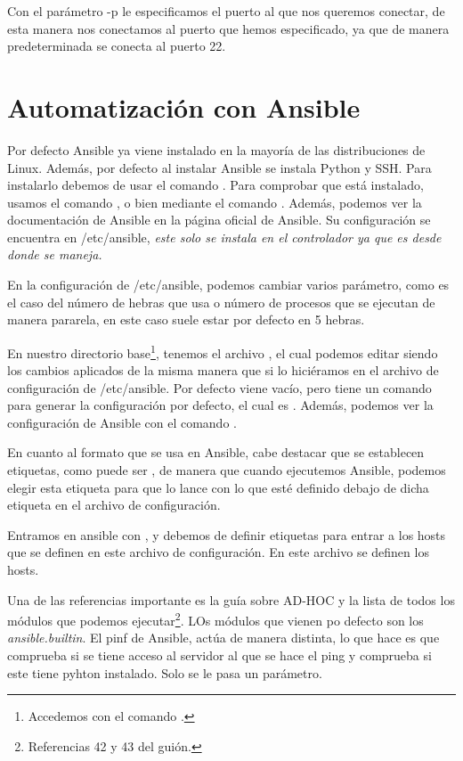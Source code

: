 Con el parámetro -p le especificamos el puerto al que nos queremos conectar, de esta manera nos conectamos al puerto que hemos especificado, ya que de manera predeterminada se conecta al puerto 22.

\section{Automatización con Ansible}

Por defecto Ansible ya viene instalado en la mayoría de las distribuciones de Linux. Además, por defecto al instalar Ansible se instala Python y SSH. Para instalarlo debemos de usar el comando . Para comprobar que está instalado, usamos el comando , o bien mediante el comando . Además, podemos ver la documentación de Ansible en la página oficial de Ansible. Su configuración se encuentra en /etc/ansible, \textit{este solo se instala en el controlador ya que es desde donde se maneja.}

En la configuración de /etc/ansible, podemos cambiar varios parámetro, como es el caso del número de hebras que usa o número de procesos que se ejecutan de manera pararela, en este caso suele estar por defecto en 5 hebras.

En nuestro directorio base\footnote{Accedemos con el comando .}, tenemos el archivo , el cual podemos editar siendo los cambios aplicados de la misma manera que si lo hiciéramos en el archivo de configuración de /etc/ansible. Por defecto viene vacío, pero tiene un comando para generar la configuración por defecto, el cual es . Además, podemos ver la configuración de Ansible con el comando .

En cuanto al formato que se usa en Ansible, cabe destacar que se establecen etiquetas, como puede ser , de manera que cuando ejecutemos Ansible, podemos elegir esta etiqueta para que lo lance con lo que esté definido debajo de dicha etiqueta en el archivo de configuración.

Entramos en ansible con , y debemos de definir etiquetas para entrar a los hosts que se definen en este archivo de configuración. En este archivo se definen los hosts. 

Una de las referencias importante es la guía sobre AD-HOC y la lista de todos los módulos que podemos ejecutar\footnote{Referencias 42 y 43 del guión.}. LOs módulos que vienen po defecto son los \textit{ansible.builtin}. El pinf de Ansible, actúa de manera distinta, lo que hace es que comprueba si se tiene acceso al servidor al que se hace el ping y comprueba si este tiene pyhton instalado. Solo se le pasa un parámetro.

